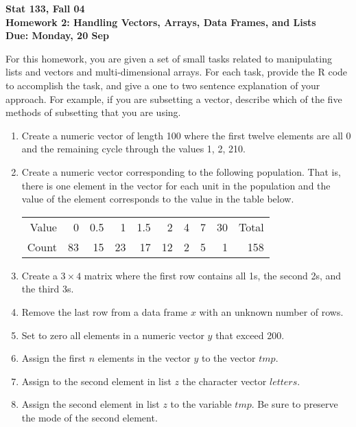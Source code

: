 \documentclass[12pt]{article}
\begin{document}
\parindent=0pt

\textbf{
Stat 133, Fall 04 \\
Homework 2: Handling Vectors, Arrays, Data Frames, and Lists\\
Due:  Monday, 20 Sep}

\medskip

For this homework, you are given a set of small tasks related to
manipulating lists and vectors and multi-dimensional arrays.
For each task, provide the R code to accomplish
the task, and give a one to two sentence explanation of your approach.
For example, if you are subsetting a vector, describe which of the
five methods of subsetting that you are using. 

\begin{enumerate}

\item Create a numeric vector of length 100 where the first twelve
elements are all 0 and the remaining cycle through the values 1, 2, 210. 

\item Create a numeric vector corresponding to the following population.
That is, there is one element in the vector for each unit in the population
and the value of the element corresponds to the value in the table below.

\begin{tabular}{rrrrrrrrr|r}
Value & 0 & 0.5 & 1 & 1.5& 2 & 4 & 7 & 30 & Total\\
Count & 83 & 15 & 23 & 17 & 12 & 2 & 5 & 1 & 158\\
\end{tabular}

\item Create a $3 \times 4$ matrix where the first row contains all 1s,
the second 2s, and the third 3s.

\item  Remove the last row from a data frame $x$ with an unknown number
of rows.

\item Set to zero all elements in a numeric vector $y$ that exceed 200.

\item Assign the first $n$ elements in the vector $y$ to the vector 
$tmp$.

\item Assign to the second element in list $z$ the character vector
$letters$.

\item Assign the second element in list $z$ to the variable 
$tmp$. Be sure to preserve the mode of the second element.


\end{enumerate}
\end{document}
